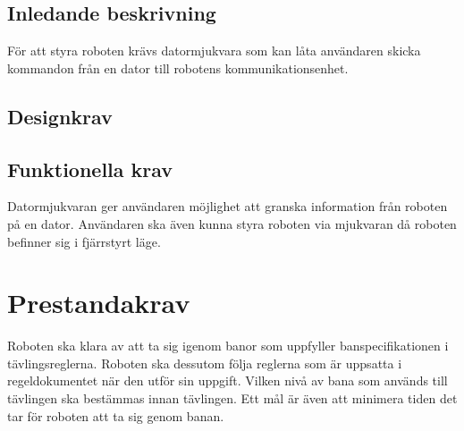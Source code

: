 \documentclass[a4paper,12pt]{article}
\begin{document}
\subsection{Inledande beskrivning}
För att styra roboten krävs datormjukvara som kan låta användaren skicka kommandon från en dator till robotens kommunikationsenhet. 


\begin{LIPSkravlista}
\end{LIPSkravlista}

\subsection{Designkrav}
\begin{LIPSkravlista}
\end{LIPSkravlista}

\subsection{Funktionella krav}
Datormjukvaran ger användaren möjlighet att granska information från roboten på en dator.
Användaren ska även kunna styra roboten via mjukvaran då roboten befinner sig i fjärrstyrt läge.


\begin{LIPSkravlista}
\end{LIPSkravlista}


\section{Prestandakrav}
Roboten ska klara av att ta sig igenom banor som uppfyller banspecifikationen i tävlingsreglerna.
Roboten ska dessutom följa reglerna som är uppsatta i regeldokumentet när den utför sin uppgift.
Vilken nivå av bana som används till tävlingen ska bestämmas innan tävlingen.
Ett mål är även att minimera tiden det tar för roboten att ta sig genom banan.
\end{document}
